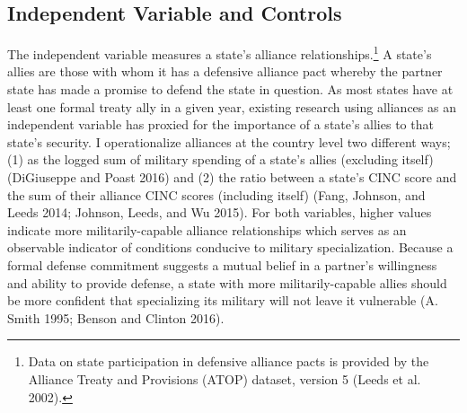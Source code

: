 \documentclass[
  12,
  letterpaper,
  DIV=11,
  numbers=noendperiod]{scrartcl}
\begin{document}
\hypertarget{independent-variable-and-controls}{%
\subsection{Independent Variable and
Controls}\label{independent-variable-and-controls}}

The independent variable measures a state's alliance
relationships.\footnote{Data on state participation in defensive
  alliance pacts is provided by the Alliance Treaty and Provisions
  (ATOP) dataset, version 5 (Leeds et al. 2002).} A state's allies are
those with whom it has a defensive alliance pact whereby the partner
state has made a promise to defend the state in question. As most states
have at least one formal treaty ally in a given year, existing research
using alliances as an independent variable has proxied for the
importance of a state's allies to that state's security. I
operationalize alliances at the country level two different ways; (1) as
the logged sum of military spending of a state's allies (excluding
itself) (DiGiuseppe and Poast 2016) and (2) the ratio between a state's
CINC score and the sum of their alliance CINC scores (including itself)
(Fang, Johnson, and Leeds 2014; Johnson, Leeds, and Wu 2015). For both
variables, higher values indicate more militarily-capable alliance
relationships which serves as an observable indicator of conditions
conducive to military specialization. Because a formal defense
commitment suggests a mutual belief in a partner's willingness and
ability to provide defense, a state with more militarily-capable allies
should be more confident that specializing its military will not leave
it vulnerable (A. Smith 1995; Benson and Clinton 2016).
\end{document}
